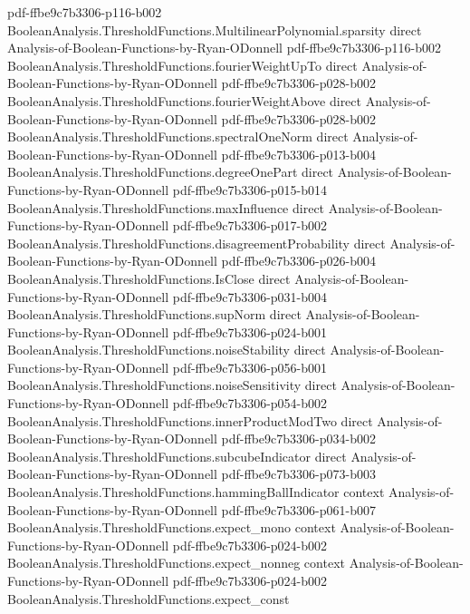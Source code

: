 \begin{theorem}
  {pdf-ffbe9c7b3306-p116-b002}
\proofstep
  {BooleanAnalysis.ThresholdFunctions.MultilinearPolynomial.sparsity}
  {direct}
  {Analysis-of-Boolean-Functions-by-Ryan-ODonnell}
  {pdf-ffbe9c7b3306-p116-b002}
\proofstep
  {BooleanAnalysis.ThresholdFunctions.fourierWeightUpTo}
  {direct}
  {Analysis-of-Boolean-Functions-by-Ryan-ODonnell}
  {pdf-ffbe9c7b3306-p028-b002}
\proofstep
  {BooleanAnalysis.ThresholdFunctions.fourierWeightAbove}
  {direct}
  {Analysis-of-Boolean-Functions-by-Ryan-ODonnell}
  {pdf-ffbe9c7b3306-p028-b002}
\proofstep
  {BooleanAnalysis.ThresholdFunctions.spectralOneNorm}
  {direct}
  {Analysis-of-Boolean-Functions-by-Ryan-ODonnell}
  {pdf-ffbe9c7b3306-p013-b004}
\proofstep
  {BooleanAnalysis.ThresholdFunctions.degreeOnePart}
  {direct}
  {Analysis-of-Boolean-Functions-by-Ryan-ODonnell}
  {pdf-ffbe9c7b3306-p015-b014}
\proofstep
  {BooleanAnalysis.ThresholdFunctions.maxInfluence}
  {direct}
  {Analysis-of-Boolean-Functions-by-Ryan-ODonnell}
  {pdf-ffbe9c7b3306-p017-b002}
\proofstep
  {BooleanAnalysis.ThresholdFunctions.disagreementProbability}
  {direct}
  {Analysis-of-Boolean-Functions-by-Ryan-ODonnell}
  {pdf-ffbe9c7b3306-p026-b004}
\proofstep
  {BooleanAnalysis.ThresholdFunctions.IsClose}
  {direct}
  {Analysis-of-Boolean-Functions-by-Ryan-ODonnell}
  {pdf-ffbe9c7b3306-p031-b004}
\proofstep
  {BooleanAnalysis.ThresholdFunctions.supNorm}
  {direct}
  {Analysis-of-Boolean-Functions-by-Ryan-ODonnell}
  {pdf-ffbe9c7b3306-p024-b001}
\proofstep
  {BooleanAnalysis.ThresholdFunctions.noiseStability}
  {direct}
  {Analysis-of-Boolean-Functions-by-Ryan-ODonnell}
  {pdf-ffbe9c7b3306-p056-b001}
\proofstep
  {BooleanAnalysis.ThresholdFunctions.noiseSensitivity}
  {direct}
  {Analysis-of-Boolean-Functions-by-Ryan-ODonnell}
  {pdf-ffbe9c7b3306-p054-b002}
\proofstep
  {BooleanAnalysis.ThresholdFunctions.innerProductModTwo}
  {direct}
  {Analysis-of-Boolean-Functions-by-Ryan-ODonnell}
  {pdf-ffbe9c7b3306-p034-b002}
\proofstep
  {BooleanAnalysis.ThresholdFunctions.subcubeIndicator}
  {direct}
  {Analysis-of-Boolean-Functions-by-Ryan-ODonnell}
  {pdf-ffbe9c7b3306-p073-b003}
\proofstep
  {BooleanAnalysis.ThresholdFunctions.hammingBallIndicator}
  {context}
  {Analysis-of-Boolean-Functions-by-Ryan-ODonnell}
  {pdf-ffbe9c7b3306-p061-b007}
\proofstep
  {BooleanAnalysis.ThresholdFunctions.expect_mono}
  {context}
  {Analysis-of-Boolean-Functions-by-Ryan-ODonnell}
  {pdf-ffbe9c7b3306-p024-b002}
\proofstep
  {BooleanAnalysis.ThresholdFunctions.expect_nonneg}
  {context}
  {Analysis-of-Boolean-Functions-by-Ryan-ODonnell}
  {pdf-ffbe9c7b3306-p024-b002}
\proofstep
  {BooleanAnalysis.ThresholdFunctions.expect_const}

\end{theorem}

